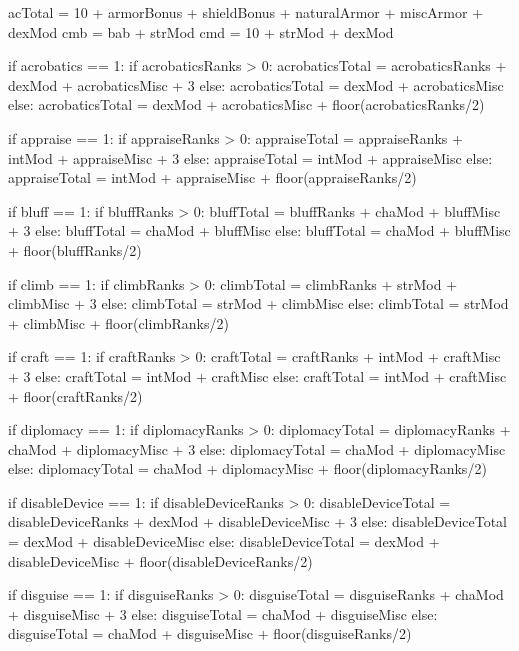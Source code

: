 \documentclass[10pt]{article}
\begin{document}
\begin{sagesilent}

	acTotal = 10 + armorBonus + shieldBonus + naturalArmor + miscArmor + dexMod
	cmb = bab + strMod
	cmd = 10 + strMod + dexMod

\end{sagesilent}
\begin{sagesilent}
if acrobatics == 1:
	 if acrobaticsRanks > 0:
	  acrobaticsTotal = acrobaticsRanks + dexMod + acrobaticsMisc + 3
	 else:
	  acrobaticsTotal = dexMod + acrobaticsMisc
else:
	 acrobaticsTotal = dexMod + acrobaticsMisc + floor(acrobaticsRanks/2)

if appraise == 1:
	 if appraiseRanks > 0:
	  appraiseTotal = appraiseRanks + intMod + appraiseMisc + 3
	 else:
	  appraiseTotal = intMod + appraiseMisc
else:
	 appraiseTotal = intMod + appraiseMisc + floor(appraiseRanks/2)

if bluff == 1:
	 if bluffRanks > 0:
	  bluffTotal = bluffRanks + chaMod + bluffMisc + 3
	 else:
	  bluffTotal = chaMod + bluffMisc
else:
	 bluffTotal = chaMod + bluffMisc + floor(bluffRanks/2)

if climb == 1:
	 if climbRanks > 0:
	  climbTotal = climbRanks + strMod + climbMisc + 3
	 else:
	  climbTotal = strMod + climbMisc
else:
	 climbTotal = strMod + climbMisc + floor(climbRanks/2)

if craft == 1:
	 if craftRanks > 0:
	  craftTotal = craftRanks + intMod + craftMisc + 3
	 else:
	  craftTotal = intMod + craftMisc
else:
	 craftTotal = intMod + craftMisc + floor(craftRanks/2)

if diplomacy == 1:
	 if diplomacyRanks > 0:
	  diplomacyTotal = diplomacyRanks + chaMod + diplomacyMisc + 3
	 else:
	  diplomacyTotal = chaMod + diplomacyMisc
else:
	 diplomacyTotal = chaMod + diplomacyMisc + floor(diplomacyRanks/2)

if disableDevice == 1:
	 if disableDeviceRanks > 0:
	  disableDeviceTotal = disableDeviceRanks + dexMod + disableDeviceMisc + 3
	 else:
	  disableDeviceTotal = dexMod + disableDeviceMisc
else:
	 disableDeviceTotal = dexMod + disableDeviceMisc + floor(disableDeviceRanks/2)

if disguise == 1:
	 if disguiseRanks > 0:
	  disguiseTotal = disguiseRanks + chaMod + disguiseMisc + 3
	 else:
	  disguiseTotal = chaMod + disguiseMisc
else:
	 disguiseTotal = chaMod + disguiseMisc + floor(disguiseRanks/2)


\end{sagesilent}
\end{document}
